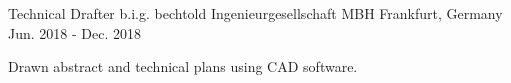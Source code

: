 

\begin{cventries}

  \cventry
    {Technical Drafter} %
    {b.i.g. bechtold Ingenieurgesellschaft MBH} %
    {Frankfurt, Germany} %
    {Jun. 2018 - Dec. 2018} %
    {
      \begin{cvitems} %
        \item {Drawn abstract and technical plans using CAD software.}
      \end{cvitems}
    }
\end{cventries}
